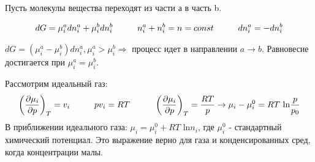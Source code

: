 \begin{lecture}
	\par Пусть молекулы вещества переходят из части а в часть b. 
	
		\begin{equation}	
	\begin{aligned}
		dG = \mu^a_idn^a_i + \mu^b_idn^b_i \hspace*{1cm} n^a_i+n^b_i = n = const \hspace*{1cm} dn^a_i = -dn^b_i
	\end{aligned}
	\end{equation}

	$dG = (\mu^a_i - \mu^b_i) dn^a_i, \mu^a_i > \mu^b_i \Rightarrow $ процесс идет в направлении $a \rightarrow b$. Равновесие достигается при $\mu^a_i = \mu^b_i$.
	\par Рассмотрим идеальный газ:
	\begin{equation}	
	\begin{aligned}
	\left(\dfrac{\partial \mu_i}{\partial p}\right)_T = v_i \hspace*{1cm} pv_i = RT \hspace*{1cm} \left(\dfrac{\partial \mu_i}{\partial p}\right)_T = \frac{RT}{p} \rightarrow \mu_i - \mu_i^0 = RT \text{ ln} \frac{p}{p_0} 
	\end{aligned}
	\end{equation}
	В приближении идеального газа: $\mu_i = \mu_i^0 + RT \text{ ln} n_i$, где $\mu_i^0$ - стандартный химический потенциал. Это выражение верно для газа и конденсированных сред, когда концентрации малы.
	
\end{lecture}
